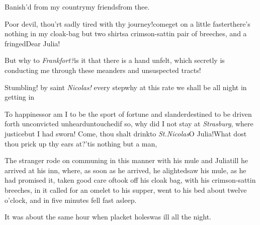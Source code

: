 \documentclass{article}
\begin{document}
\tsh Banish’d from my country\tsk my friends\tsk from thee.\tsk

Poor devil, thou’rt sadly tired with\break
thy journey!\tsk come\tsk get on a little faster\tsk there’s nothing in my
cloak-bag but two shirts\tsk a crimson-sattin pair of
breeches, and a fringed\tsk Dear Julia!

\tsh But why to \textit{Frankfort?}\tsk is it that there is
a hand unfelt, which secretly is conducting me through these
meanders and unsuspected tracts!\tsk{}

\tsk Stumbling! by saint \textit{Nicolas!} every 
step\tsk\!\tsk why at this rate we shall be
all night in getting in\tsh

\tsk To happiness\tsk or am I to be the sport of fortune and
slander\tsk destined to be driven forth unconvicted\tsk
unheard\tsk untouched\tsk if so, why did I not stay at
\textit{Strasburg}, where justice\tsk but I had sworn!\tsk
Come, thou shalt drink\tsk to \textit{St.\@ Nicolas}\tsk O
Julia!\tsk\!\tsk What dost thou prick up thy ears at?\tsh ’tis
nothing but a man, \etc\tsh

The stranger rode on communing in this manner with his mule
and Julia\tsk\break till he arrived at his inn, where, as soon as
he arrived, he alighted\tsk saw his mule, 
as he had promised it, taken good care\break 
of\tsh took off his cloak bag, with his\break
crimson-sattin breeches, \etc in it\tsh{}
called for an omelet
to his supper, went to his bed about twelve o’clock, and in
five minutes fell fast asleep.

It was about the same hour when\break
{} 
placket holes\tsk was ill all the night.
\end{document}
